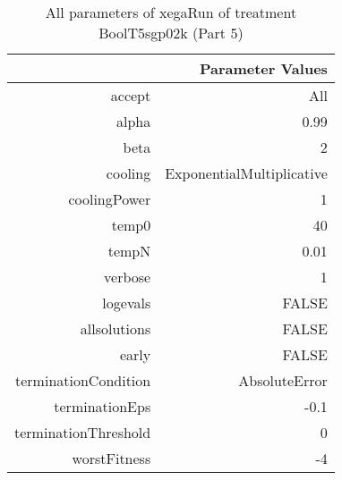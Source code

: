 \begin{table}[ht]
\centering
\begin{tabular}{rr}
  \hline
 & Parameter Values \\ 
  \hline
accept & All \\ 
  alpha & 0.99 \\ 
  beta & 2 \\ 
  cooling & ExponentialMultiplicative \\ 
  coolingPower & 1 \\ 
  temp0 & 40 \\ 
  tempN & 0.01 \\ 
  verbose & 1 \\ 
  logevals & FALSE \\ 
  allsolutions & FALSE \\ 
  early & FALSE \\ 
  terminationCondition & AbsoluteError \\ 
  terminationEps & -0.1 \\ 
  terminationThreshold & 0 \\ 
  worstFitness & -4 \\ 
   \hline
\end{tabular}
\caption{ All parameters of xegaRun of treatment BoolT5sgp02k 
 (Part 5)} 
\end{table}
